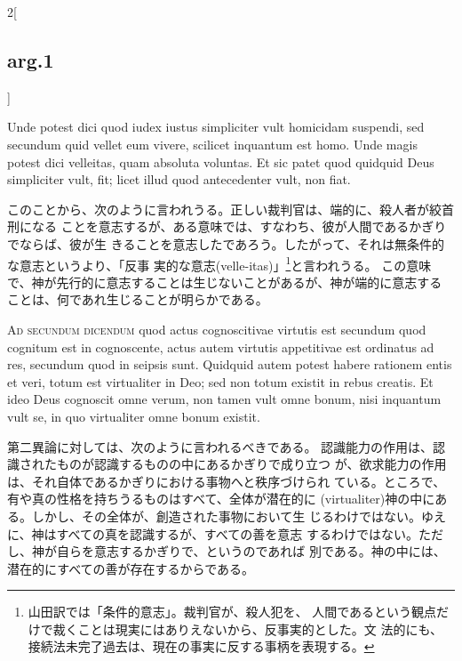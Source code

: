\documentclass[paper=a4paper,fontsize=10pt,jafontsize=9pt,titlepage]{jlreq}
\begin{document}
\begin{paracol}{2}[\subsection{arg.1}]
\switchcolumn*


Unde
potest dici quod iudex iustus simpliciter vult homicidam suspendi, sed
secundum quid vellet eum vivere, scilicet inquantum est homo. Unde magis
potest dici velleitas, quam absoluta voluntas. Et sic patet quod
quidquid Deus simpliciter vult, fit; licet illud quod antecedenter vult,
non fiat.

\switchcolumn

このことから、次のように言われうる。正しい裁判官は、端的に、殺人者が絞首刑になる
 ことを意志するが、ある意味では、すなわち、彼が人間であるかぎりでならば、彼が生
 きることを意志したであろう。したがって、それは無条件的な意志というより、「反事
 実的な意志(velle-itas)」\footnote{山田訳では「条件的意志」。裁判官が、殺人犯を、
 人間であるという観点だけで裁くことは現実にはありえないから、反事実的とした。文
 法的にも、接続法未完了過去は、現在の事実に反する事柄を表現する。}と言われうる。
 この意味で、神が先行的に意志することは生じないことがあるが、神が端的に意志する
 ことは、何であれ生じることが明らかである。

\switchcolumn*[\subsection{ad.2}]


{\scshape Ad secundum dicendum} quod actus cognoscitivae
virtutis est secundum quod cognitum est in cognoscente, actus autem
virtutis appetitivae est ordinatus ad res, secundum quod in seipsis
sunt. Quidquid autem potest habere rationem entis et veri, totum est
virtualiter in Deo; sed non totum existit in rebus creatis. Et ideo Deus
cognoscit omne verum, non tamen vult omne bonum, nisi inquantum vult se,
in quo virtualiter omne bonum existit.

\switchcolumn

第二異論に対しては、次のように言われるべきである。
認識能力の作用は、認識されたものが認識するものの中にあるかぎりで成り立つ
 が、欲求能力の作用は、それ自体であるかぎりにおける事物へと秩序づけられ
 ている。ところで、有や真の性格を持ちうるものはすべて、全体が潜在的に
 (virtualiter)神の中にある。しかし、その全体が、創造された事物において生
 じるわけではない。ゆえに、神はすべての真を認識するが、すべての善を意志
 するわけではない。ただし、神が自らを意志するかぎりで、というのであれば
 別である。神の中には、潜在的にすべての善が存在するからである。

\switchcolumn*[\subsection{ad.3}]



\end{paracol}
\end{document}
